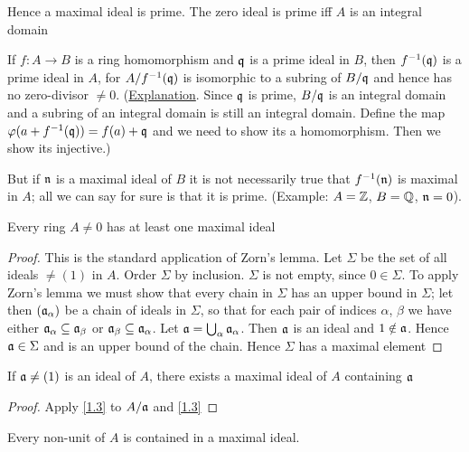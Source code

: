 \documentclass[11pt]{article}
\begin{document}
Hence a maximal ideal is prime. The zero ideal is prime iff \(A\) is an integral domain

If \(f:A\to B\) is a ring homomorphism and \(\mathfrak{q}\) is a prime ideal in \(B\), then \(f^{-1}(\mathfrak{q})\) is
a prime ideal in \(A\), for \(A/f^{-1}(\mathfrak{q})\) is isomorphic to a subring of \(B/\mathfrak{q}\) and hence has
no zero-divisor \(\neq 0\). (\href{https://asgarli.wordpress.com/2013/04/21/inverse-image-of-a-prime-ideal-is-prime/}{Explanation}. Since \(\mathfrak{q}\) is prime, \(B/\mathfrak{q}\) is an integral domain and a
subring of an integral domain is still an integral domain. Define the map
\(\varphi(a+f^{-1}(\mathfrak{q}))=f(a)+\mathfrak{q}\) and we need to show its a homomorphism. Then we show its injective.)

But if \(\mathfrak{n}\) is a maximal ideal of \(B\) it is not necessarily true that \(f^{-1}(\mathfrak{n})\) is
maximal in \(A\); all we can say for sure is that it is prime. (Example: \(A=\mathbb{Z}\), \(B=\mathbb{Q}\), \(\mathfrak{n}=0\)).

\begin{theorem}[]
\label{1.3}
Every ring \(A\neq 0\) has at least one maximal ideal
\end{theorem}

\begin{proof}
This is the standard application of Zorn's lemma. Let \(\Sigma\) be the set of all ideals \(\neq(1)\)
in \(A\). Order \(\Sigma\) by inclusion. \(\Sigma\) is not empty, since \(0\in\Sigma\). To apply Zorn's lemma we must
show that every chain in \(\Sigma\) has an upper bound in \(\Sigma\); let then \((\mathfrak{a}_\alpha)\) be a chain of ideals in
\(\Sigma\), so that for each pair of indices \(\alpha\), \(\beta\) we have either \(\mathfrak{a}_\alpha\subseteq \mathfrak{a}_\beta\) or \(\mathfrak{a}_\beta\subseteq\mathfrak{a}_\alpha\).
Let \(\mathfrak{a}=\bigcup_\alpha\mathfrak{a}_\alpha\). Then \(\mathfrak{a}\) is an ideal and \(1\notin\mathfrak{a}\). Hence \(\mathfrak{a}\in\Sigma\) and is an upper bound of the
chain. Hence \(\Sigma\) has a maximal element
\end{proof}

\begin{corollary}[]
If \(\mathfrak{a}\neq(1)\) is an ideal of \(A\), there exists a maximal ideal of \(A\) containing \(\mathfrak{a}\)
\end{corollary}

\begin{proof}
Apply \ref{1.3} to \(A/\mathfrak{a}\) and \ref{1.3}
\end{proof}

\begin{corollary}[]
\label{1.5}
Every non-unit of \(A\) is contained in a maximal ideal.
\end{corollary}
\end{document}
